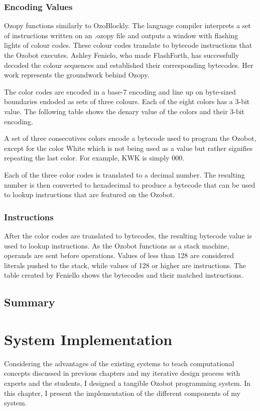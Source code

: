 \documentclass[oneside,%
                    author={Malak Hajji},
                    degree={BSc},
                    title={Designing An Accessible Computational Toolkit For Students},
                  subtitle={With Mixed Visual Abilities}]{dissertation}
\begin{document}
\subsection{Encoding Values}
Ozopy functions similarly to OzoBlockly. The language compiler interprets a set of instructions written on an .ozopy file and outputs a window with flashing lights  of colour codes. These colour codes translate to bytecode instructions that the Ozobot executes. Ashley Fenielo, who made FlashForth, has successfully decoded the colour sequences and established their corresponding bytecodes. Her work represents the groundwork behind Ozopy.

The color codes are encoded in a base-7 encoding and line up on byte-sized boundaries endoded as sets of three colours. Each of the eight colors has a 3-bit value. The following table shows the denary value of the colors and their 3-bit encoding.



A set of three consecutives colors encode a bytecode used to program the Ozobot, except for the color White which is not being used as a value but rather signifies repeating the last color. For example, KWK is simply 000.

Each of the three color codes is translated to a decimal number. The resulting number is then converted to hexadecimal to produce a bytecode that can be used to lookup instructions that are featured on the Ozobot. 

\subsection{Instructions}
After the color codes are translated to bytecodes, the resulting bytecode value is used to lookup instructions. As the Ozobot functions as a stack machine, operands are sent before operations.
Values of less than 128 are considered literals pushed to the stack, while values of 128 or higher are instructions. The table created by Feniello shows the bytecodes and their matched instructions. 


\section{Summary}


\chapter{System Implementation}
Considering the advantages of the existing systems to teach computational concepts discussed in previous chapters and my iterative design process with experts and the students, I designed a tangible Ozobot programming system. In this chapter, I present the implementation of the different components of my system.
\end{document}
